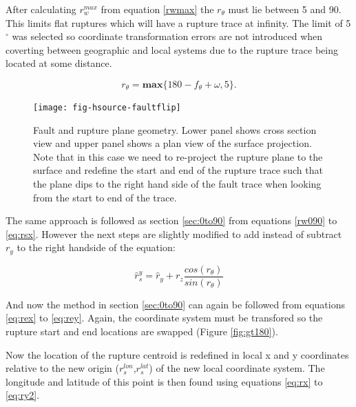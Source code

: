 
After calculating $r_w^{max}$ from equation \ref{rwmax} the $r_\theta$ must lie between 5 and 90. This limits flat ruptures which will have a rupture trace at infinity. The limit
of 5$^\circ$ was selected so coordinate transformation errors are not introduced when coverting between geographic and local systems due to the rupture trace being located at some
distance. 

\begin{equation}
r_\theta = \mathbf{max} \{ 180 - f_\theta + \omega, 5 \} .
\end{equation}



\begin{figure}[htp]
\centerline{\texttt{[image: fig-hsource-faultflip]}}
\caption{Fault and rupture plane geometry. Lower panel shows cross section view and upper panel shows a plan view of the surface 
projection. Note that in this case we need to re-project the rupture plane to the surface and redefine the start and end of the 
rupture trace such that the plane dips to the right hand side of the fault trace when looking from the start to end of the trace.}
\label{fig:gt90}
\end{figure}


The same approach is followed as section \ref{sec:0to90} from equations \ref{rw090} to \ref{eq:rsx}. However the next steps are slightly 
modified to add instead of subtract $r_y$ to the right handside of the equation: 

\begin{equation}
\hat{r}_s^{y} = \hat{r}_y + r_z  \frac{cos(r_\theta)}{sin(r_\theta)}
\end{equation}

And now the method in section \ref{sec:0to90} can again be followed from equations \ref{eq:rex} to \ref{eq:rey}. 
Again, the coordinate system must be transfored so the rupture start and end locations are swapped (Figure \ref{fig:gt180}).

Now the location of the rupture centroid is redefined in local x and y coordinates relative to the new 
origin ($r_s^{lon}$,$ r_s^{lat}$) of the new local coordinate system. The longitude and 
latitude of this point is then found using equations \ref{eq:rx} to \ref{eq:ry2}.


